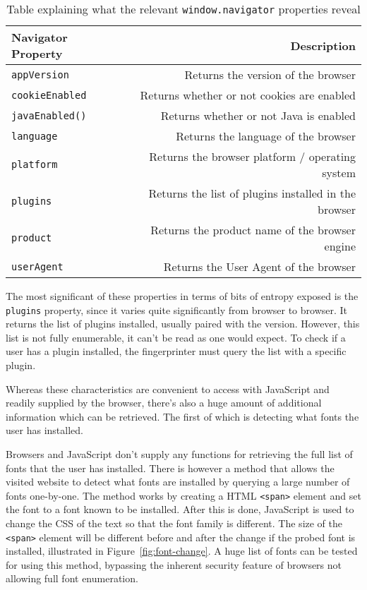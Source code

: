 \begin{table}[h]
\centering
\begin{tabular}{| l | r |}
    \hline
    \textbf{Navigator Property} & \textbf{Description} \\ \hline
    \texttt{appVersion} & {Returns the version of the browser} \\ \hline
    \texttt{cookieEnabled} & {Returns whether or not cookies are enabled} \\ \hline
    \texttt{javaEnabled()} & {Returns whether or not Java is enabled} \\ \hline
    \texttt{language} & {Returns the language of the browser} \\ \hline
    \texttt{platform} & {Returns the browser platform / operating system} \\ \hline
    \texttt{plugins} & {Returns the list of plugins installed in the browser} \\ \hline
    \texttt{product} & {Returns the product name of the browser engine} \\ \hline
    \texttt{userAgent} & {Returns the User Agent of the browser} \\
    \hline
\end{tabular}
\caption{Table explaining what the relevant \texttt{window.navigator} properties reveal}
\label{tab:navigator-props}
\end{table}

The most significant of these properties in terms of bits of entropy exposed is the \texttt{plugins} property, since it varies quite significantly from browser to browser.
It returns the list of plugins installed, usually paired with the version.
However, this list is not fully enumerable, it can't be read as one would expect.
To check if a user has a plugin installed, the fingerprinter must query the list with a specific plugin.

Whereas these characteristics are convenient to access with JavaScript and readily supplied by the browser, there's also a huge amount of additional information which can be retrieved.
The first of which is detecting what fonts the user has installed.

Browsers and JavaScript don't supply any functions for retrieving the full list of fonts that the user has installed.
There is however a method that allows the visited website to detect what fonts are installed by querying a large number of fonts one-by-one.
The method works by creating a HTML \texttt{<span>} element and set the font to a font known to be installed.
After this is done, JavaScript is used to change the CSS of the text so that the font family is different.
The size of the \texttt{<span>} element will be different before and after the change if the probed font is installed, illustrated in Figure~\ref{fig:font-change}.
A huge list of fonts can be tested for using this method, bypassing the inherent security feature of browsers not allowing full font enumeration.


